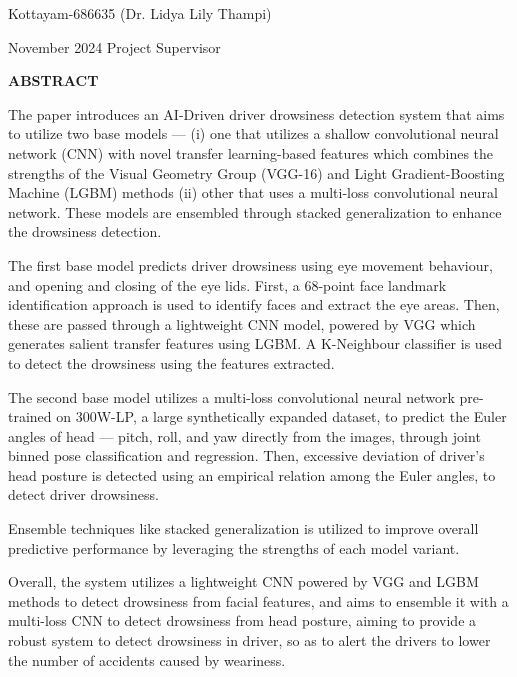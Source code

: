 \documentclass[12pt,a4wide]{report}
\theoremstyle{plain}
\theoremstyle{definition}
\theoremstyle{remark}
\begin{document}
\vspace{4cm}

\noindent Kottayam-686635  \hfill (Dr. Lidya Lily Thampi)

\noindent November  2024 \hfill Project Supervisor

\clearpage




\begin{center}
{\Large{\bf{ABSTRACT}}}
\end{center}

The paper introduces an AI-Driven driver drowsiness detection system that aims to utilize two base models --- (i) one that utilizes a shallow convolutional neural network (CNN) with novel transfer learning-based features which combines the strengths of the Visual Geometry Group (VGG-16) and Light Gradient-Boosting Machine (LGBM) methods (ii) other that uses a multi-loss convolutional neural network. These models are ensembled through stacked generalization to enhance the drowsiness detection.

The first base model predicts driver drowsiness using eye movement behaviour, and opening and closing of the eye lids. First, a 68-point face landmark identification approach is
used to identify faces and extract the eye areas. Then, these are passed through a lightweight CNN model, powered by VGG which  generates salient transfer features using LGBM. A K-Neighbour classifier is used to detect the drowsiness using the features extracted.

The second base model utilizes a multi-loss convolutional neural network pre-trained on 300W-LP, a large synthetically expanded dataset, to predict the Euler angles of head --- pitch, roll, and yaw directly from the images,  through joint binned pose classification and regression. Then, excessive deviation of driver's head posture is detected using an empirical relation among the Euler angles, to detect driver drowsiness.

Ensemble techniques like stacked generalization is utilized to improve overall predictive performance by leveraging the strengths of each model variant.

Overall, the system utilizes a lightweight CNN powered by VGG and LGBM methods to detect drowsiness from facial features, and aims to ensemble it with a multi-loss CNN to detect drowsiness from head posture, aiming to provide a robust system to detect drowsiness in driver, so as to alert the drivers to lower the number of accidents caused by weariness.
\end{document}
